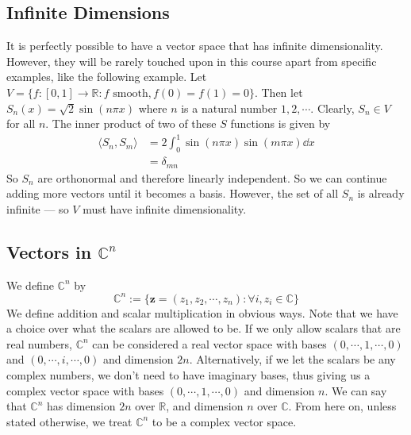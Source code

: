 \documentclass{article}
\begin{document}
	\subsection{Infinite Dimensions}
	It is perfectly possible to have a vector space that has infinite dimensionality. However, they will be rarely touched upon in this course apart from specific examples, like the following example. Let $V = \{ f: [0, 1] \to \mathbb R: f \text{ smooth}, f(0) = f(1) = 0\}$. Then let $S_n(x) = \sqrt 2 \sin(n \pi x)$ where $n$ is a natural number $1, 2, \cdots$. Clearly, $S_n \in V$ for all $n$. The inner product of two of these $S$ functions is given by
	\begin{align*}
		\langle S_n, S_m \rangle &= 2 \int_0^1 \sin(n \pi x) \sin(m \pi x) \dd x \\
		&= \delta_{mn}
	\end{align*}
	So $S_n$ are orthonormal and therefore linearly independent. So we can continue adding more vectors until it becomes a basis. However, the set of all $S_n$ is already infinite --- so $V$ must have infinite dimensionality.

	\subsection{Vectors in $\mathbb C^n$}
	We define $\mathbb C^n$ by
	\[ \mathbb C^n := \{ \bm z = (z_1, z_2, \cdots, z_n): \forall i, z_i \in \mathbb C \} \]
	We define addition and scalar multiplication in obvious ways. Note that we have a choice over what the scalars are allowed to be. If we only allow scalars that are real numbers, $\mathbb C^n$ can be considered a real vector space with bases $(0, \cdots, 1, \cdots, 0)$ and $(0, \cdots, i, \cdots, 0)$ and dimension $2n$. Alternatively, if we let the scalars be any complex numbers, we don't need to have imaginary bases, thus giving us a complex vector space with bases $(0, \cdots, 1, \cdots, 0)$ and dimension $n$. We can say that $\mathbb C^n$ has dimension $2n$ over $\mathbb R$, and dimension $n$ over $\mathbb C$. From here on, unless stated otherwise, we treat $\mathbb C^n$ to be a complex vector space.
\end{document}

